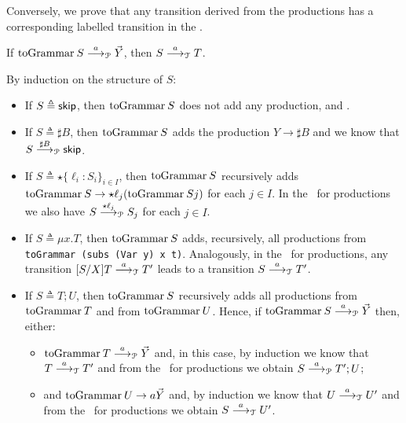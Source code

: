 Conversely, we prove that any transition derived from the productions
has a corresponding labelled transition in the \LTS.

\begin{lemma}
  If $\toGrammarf S \LTSderivesP \vec Y$, then $S\LTSderives
  T$.\\ 
\end{lemma}

\begin{itemizeproof}
  By induction on the structure of $S$:
  \begin{itemize}
  \item If $S \triangleq \skipk$, then $\toGrammarf S$ does not add
    any production, and . 
  \item If $S \triangleq \sharp B$, then $\toGrammarf S$ adds the
    production $Y\rightarrow \sharp B$ and we know that
    $S \LTSderivesP[\sharp B] \skipk$.
  \item If $S\triangleq \star \{\ell_i : S_i\}_{i\in I}$, then
    $\toGrammarf S$ recursively adds
    $\toGrammarf S \rightarrow \star \ell_j(\toGrammarf{Sj})$ for each
    $j\in I$. In the \LTS\ for productions we also have
    $S \LTSderivesP[\star\ell_j] S_j$ for each $j\in I$.
  \item If $S\triangleq \mu x.T$, then $\toGrammarf S$ adds,
    recursively, all productions from
    \lstinline|toGrammar (subs (Var y) x t)|.  Analogously, in the
    \LTS\ for productions, any transition $\subs SXT \LTSderives T'$
    leads to a transition $S \LTSderives T'$. 
  \item If $S \triangleq T;U$, then $\toGrammarf S$ recursively adds
    all productions from $\toGrammarf T$ and from $\toGrammarf
    U$. Hence, if $\toGrammarf S \LTSderivesP \vec Y$ then, either:
    \begin{itemize}
    \item $\toGrammarf T \LTSderivesP \vec Y$ and, in this case, by
      induction we know that $T \LTSderives T'$ and from the \LTS\ for
      productions we obtain $S \LTSderivesP T';U$;
    \item {} and $\toGrammarf U \rightarrow a\vec Y$ and, by
      induction we know that $U \LTSderives[a] U'$ and from the \LTS\
      for productions we obtain $S \LTSderives U'$.
    \end{itemize}
  \end{itemize}
\end{itemizeproof}

